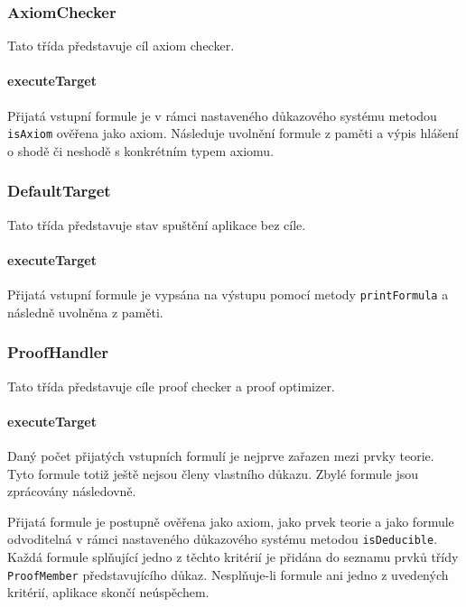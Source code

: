 \documentclass[thesis=B,czech,hidelinks]{thesis}[2012/06/26]
\begin{document}
\subsubsection{AxiomChecker}

Tato třída představuje cíl axiom checker.

\paragraph{executeTarget}

Přijatá vstupní formule je v rámci nastaveného důkazového systému metodou \texttt{isAxiom} ověřena jako axiom. Následuje uvolnění formule z paměti a výpis hlášení o shodě či neshodě s konkrétním typem axiomu.

\subsubsection{DefaultTarget}

Tato třída představuje stav spuštění aplikace bez cíle.

\paragraph{executeTarget}

Přijatá vstupní formule je vypsána na výstupu pomocí metody \texttt{printFormula} a následně uvolněna z paměti.

\subsubsection{ProofHandler}

Tato třída představuje cíle proof checker a proof optimizer.

\paragraph{executeTarget}

Daný počet přijatých vstupních formulí je nejprve zařazen mezi prvky teorie. Tyto formule totiž ještě nejsou členy vlastního důkazu. Zbylé formule jsou zprácovány následovně.

Přijatá formule je postupně ověřena jako axiom, jako prvek teorie a jako formule odvoditelná v rámci nastaveného důkazového systému metodou \texttt{isDeducible}. Každá formule splňující jedno z těchto kritérií je přidána do seznamu prvků třídy \texttt{ProofMember} představujícího důkaz. Nesplňuje-li formule ani jedno z uvedených kritérií, aplikace skončí neúspěchem.
\end{document}
